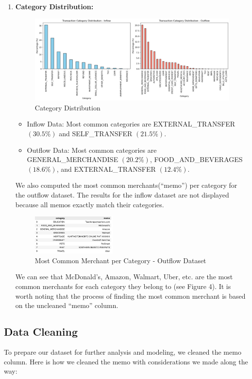 \documentclass[12pt,letterpaper]{article}
\begin{document}
\begin{enumerate}
    \item{\textbf{Category Distribution:}}
    \begin{figure}[H]
        \centering
        \includegraphics[width=1.0\textwidth]{pngs/category_dist.png}
        \caption{Category Distribution}
        \label{fig:enter-label}
    \end{figure}
    \begin{itemize}
        \item Inflow Data: Most common categories are EXTERNAL\_TRANSFER $(30.5\%)$ and SELF\_TRANSFER $(21.5\%)$.
        \item Outflow Data: Most common categories are GENERAL\_MERCHANDISE $(20.2\%)$, FOOD\_AND\_BEVERAGES $(18.6\%)$, and EXTERNAL\_TRANSFER $(12.4\%)$.
    \end{itemize}

    {We also computed the most common merchants(“memo”) per category for the outflow dataset. The results for the inflow dataset are not displayed because all memos exactly match their categories.}
    \begin{figure}[H]
        \centering
        \includegraphics[width=0.4\textwidth]{pngs/cmn_merchant.png}
        \caption{Most Common Merchant per Category - Outflow Dataset}
        \label{fig:enter-label}
    \end{figure}
    {We can see that McDonald’s, Amazon, Walmart, Uber, etc. are the most common merchants for each category they belong to (see Figure 4). It is worth noting that the process of finding the most common merchant is based on the uncleaned “memo” column.}
\end{enumerate}

\subsection{Data Cleaning}
{To prepare our dataset for further analysis and modeling, we cleaned the memo column.}
{Here is how we cleaned the memo with considerations we made along the way:}
\end{document}
